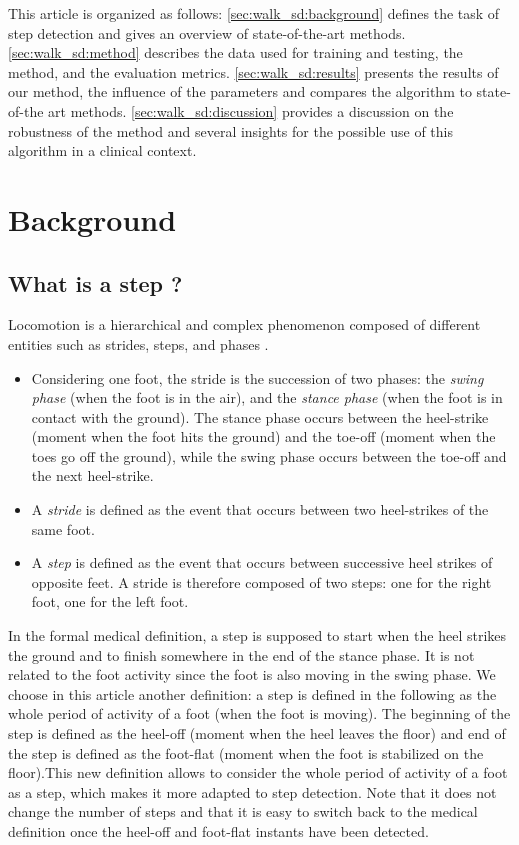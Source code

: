 \documentclass[../thesis.tex]{subfiles}
\begin{document}
This article is organized as follows: \autoref{sec:walk_sd:background} defines the task of step detection and gives an overview of state-of-the-art methods. \autoref{sec:walk_sd:method} describes the data used for training and testing, the method,  and the evaluation metrics. \autoref{sec:walk_sd:results} presents the results of our method, the influence of the parameters and compares the algorithm to state-of-the art methods. \autoref{sec:walk_sd:discussion} provides a discussion on the robustness of the method and several insights for the possible use of this algorithm in a clinical context.


\section{Background}
\label{sec:walk_sd:background}

\subsection{What is a step ?}
\label{sub:walk_sd:stepdef}


Locomotion is a hierarchical and complex phenomenon composed of different entities such as strides, steps, and phases  \citep{auvinet2002reference,mariani}. 
\begin{itemize}
\item  Considering one foot, the stride is the succession of two phases: the \textit{swing phase} (when the foot is in the air), and the \textit{stance phase} (when the foot is in contact with the ground). The stance phase occurs between the heel-strike (moment when the foot hits the ground) and the toe-off (moment when the toes go off the ground), while the swing phase occurs between the toe-off and the next heel-strike.
 \item A \textit{stride} is defined as the event that occurs between two heel-strikes of the same foot. 
\item A \textit{step} is defined as the event that occurs between successive heel strikes of opposite feet. A stride is therefore composed of two steps: one for the right foot, one for the left foot.
\end{itemize}
In the formal medical definition, a step is supposed to start when the heel strikes the ground and to finish somewhere in the end of the stance phase. It is not related to the foot activity since the foot is also moving in the swing phase. We choose in this article another definition: a step is defined in the following as the whole period of activity of a foot (when the foot is moving).  The beginning of the step is  defined as the heel-off (moment when the heel leaves the floor) and end of the step is defined as the foot-flat (moment when the foot is stabilized on the floor).This new definition allows to consider the whole period of activity of a foot as a step, which makes it more adapted to step detection. Note that it does not change the number of steps and that it is easy to switch back to the medical definition once the heel-off and foot-flat instants have been detected.
\end{document}
